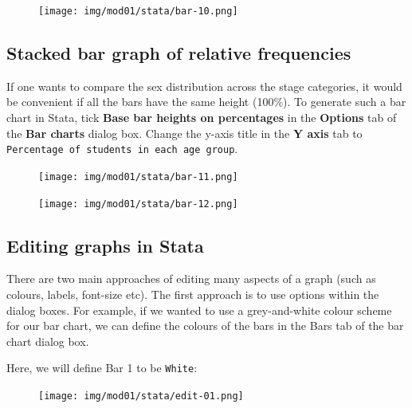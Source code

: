 \documentclass[
  a4paper,
]{memoir}
\begin{document}
\begin{figure}[H]

{\centering \texttt{[image: img/mod01/stata/bar-10.png]}

}

\end{figure}

\hypertarget{stacked-bar-graph-of-relative-frequencies}{%
\subsection{Stacked bar graph of relative
frequencies}\label{stacked-bar-graph-of-relative-frequencies}}

If one wants to compare the sex distribution across the stage
categories, it would be convenient if all the bars have the same height
(100\%). To generate such a bar chart in Stata, tick \textbf{Base bar
heights on percentages} in the \textbf{Options} tab of the \textbf{Bar
charts} dialog box. Change the y-axis title in the \textbf{Y axis} tab
to \texttt{Percentage\ of\ students\ in\ each\ age\ group}.

\begin{figure}[H]

{\centering \texttt{[image: img/mod01/stata/bar-11.png]}

}

\end{figure}

\begin{figure}[H]

{\centering \texttt{[image: img/mod01/stata/bar-12.png]}

}

\end{figure}

\hypertarget{editing-graphs-in-stata}{%
\subsection{Editing graphs in Stata}\label{editing-graphs-in-stata}}

There are two main approaches of editing many aspects of a graph (such
as colours, labels, font-size etc). The first approach is to use options
within the dialog boxes. For example, if we wanted to use a
grey-and-white colour scheme for our bar chart, we can define the
colours of the bars in the Bars tab of the bar chart dialog box.

Here, we will define Bar 1 to be \texttt{White}:

\begin{figure}[H]

{\centering \texttt{[image: img/mod01/stata/edit-01.png]}

}

\end{figure}
\end{document}

